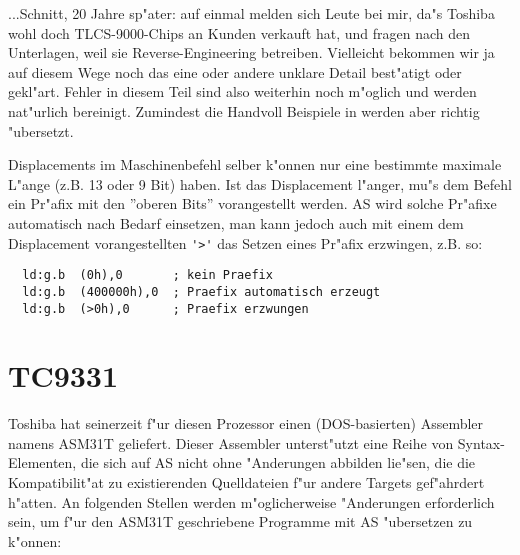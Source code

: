 \documentclass[12pt,a4paper,twoside]{report}
\begin{document}
...Schnitt, 20 Jahre sp"ater: auf einmal melden sich Leute bei
mir, da"s Toshiba wohl doch TLCS-9000-Chips an Kunden verkauft
hat, und fragen nach den Unterlagen, weil sie Reverse-Engineering
betreiben.  Vielleicht bekommen wir ja auf diesem Wege noch das
eine oder andere unklare Detail best"atigt oder gekl"art.  Fehler in
diesem Teil sind also weiterhin noch m"oglich und werden nat"urlich
bereinigt.  Zumindest die Handvoll Beispiele in \cite{Tosh9000} werden
aber richtig "ubersetzt.

Displacements im Maschinenbefehl selber k"onnen nur eine bestimmte
maximale L"ange (z.B. 13 oder 9 Bit) haben.  Ist das Displacement
l"anger, mu"s dem Befehl ein Pr"afix mit den ''oberen Bits''
vorangestellt werden.  AS wird solche Pr"afixe automatisch nach
Bedarf einsetzen, man kann jedoch auch mit einem dem Displacement
vorangestellten \verb!'>'! das Setzen eines Pr"afix erzwingen,
z.B. so:

\begin{verbatim}
  ld:g.b  (0h),0       ; kein Praefix
  ld:g.b  (400000h),0  ; Praefix automatisch erzeugt
  ld:g.b  (>0h),0      ; Praefix erzwungen
\end{verbatim}


\section{TC9331}

Toshiba hat seinerzeit f"ur diesen Prozessor einen (DOS-basierten)
Assembler namens ASM31T geliefert.  Dieser Assembler unterst"utzt
eine Reihe von Syntax-Elementen, die sich auf AS nicht ohne
"Anderungen abbilden lie"sen, die die Kompatibilit"at
zu existierenden Quelldateien f"ur andere Targets gef"ahrdert
h"atten.  An folgenden Stellen werden m"oglicherweise "Anderungen
erforderlich sein, um f"ur den ASM31T geschriebene Programme mit
AS "ubersetzen zu k"onnen:
\end{document}
